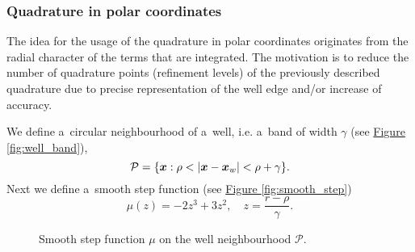 \documentclass[FM,Dis]{tulthesis}
\newcommand{\fig}[1]{\hyperref[#1]{Figure \ref{#1}}}
\newcommand{\figpath}{figures/}
\begin{document}
\subsubsection{Quadrature in polar coordinates}

The idea for the usage of the quadrature in polar coordinates originates from the radial character of the terms
that are integrated. 
The motivation is to reduce the number of quadrature points (refinement levels) of the previously described quadrature due to
precise representation of the well edge and/or increase of accuracy.

We define a~circular neighbourhood of a~well, i.e. a~band of width $\gamma$ (see \fig{fig:well_band}),
\[ \mathcal{P} = \{\mathbf{\boldsymbol{x}}: \rho < \left|\mathbf{\boldsymbol{x}} - \mathbf{\boldsymbol{x}}_w\right| < \rho + \gamma \}.\]
Next we define a~smooth step function (see \fig{fig:smooth_step})
\[\mu(z) = -2 z^3 +3 z^2,\quad z=\frac{r-\rho}{\gamma}.\]%
%
\begin{figure}[!htb]
  \vspace{-35pt}
  \centering    
  \hspace{0pt}
  \caption[Smooth step function]
  {Smooth step function $\mu$ on the well neighbourhood $\mathcal{P}$.
  }
  \label{fig:smooth_step_well_band}
\end{figure}    
\end{document}
